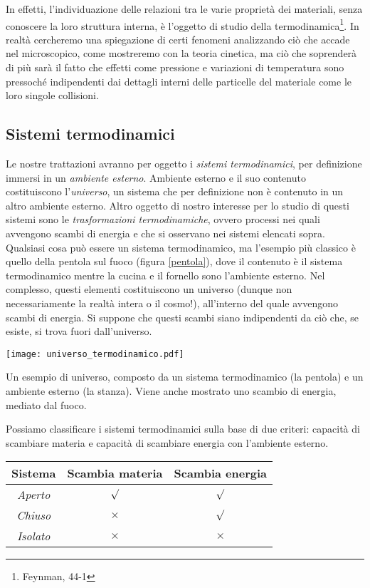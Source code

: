 In effetti, l'individuazione delle relazioni tra le varie proprietà
dei materiali, senza conoscere la loro struttura interna, è l'oggetto
di studio della termodinamica\footnote{Feynman, 44-1}. In realtà cercheremo una spiegazione di certi fenomeni
analizzando ciò che accade nel microscopico, come mostreremo con la
teoria cinetica, ma ciò che soprenderà di più sarà il fatto che effetti
come pressione e variazioni di temperatura sono pressoché indipendenti
dai dettagli interni delle particelle del materiale come le loro singole
collisioni.

\subsection{Sistemi termodinamici}
Le nostre trattazioni avranno per oggetto i \textit{sistemi termodinamici}, per
definizione immersi in un \textit{ambiente esterno}. Ambiente esterno e il suo
contenuto costituiscono l'\textit{universo}, un sistema che per definizione non
è contenuto in un altro ambiente esterno.
Altro oggetto di nostro interesse per lo studio di questi sistemi sono le
\textit{trasformazioni termodinamiche}, ovvero processi nei quali avvengono
scambi di energia e che si osservano nei sistemi elencati sopra. Qualsiasi
cosa può essere un sistema termodinamico, ma l'esempio più classico è quello
della pentola sul fuoco (figura \ref{pentola}), dove il contenuto è il sistema termodinamico mentre
la cucina e il fornello sono l'ambiente esterno. Nel complesso, questi
elementi costituiscono un universo (dunque non necessariamente la
realtà intera o il cosmo!), all'interno del quale avvengono scambi di
energia. Si suppone che questi scambi siano indipendenti da ciò che, se esiste,
si trova fuori dall'universo.

\begin{marginfigure}
    \centering
    \texttt{[image: universo\_termodinamico.pdf]}
    \caption{Un esempio di universo, composto da un sistema termodinamico
    (la pentola) e un ambiente esterno (la stanza). Viene anche mostrato uno
    scambio di energia, mediato dal fuoco.}
    \label{pentola}
\end{marginfigure}


Possiamo classificare i sistemi termodinamici sulla base di due criteri: capacità
di scambiare materia e capacità di scambiare energia con l'ambiente esterno.

\begin{center}
    \begin{tabular}{c | c | c}
        Sistema & Scambia materia & Scambia energia \\
        \hline
        \hline
        \textit{Aperto} & $\surd$ & $\surd$ \\
        \hline
        \textit{Chiuso} & $\times$ & $\surd$ \\
        \hline
        \textit{Isolato} & $\times$ & $\times$
    \end{tabular}
\end{center}

